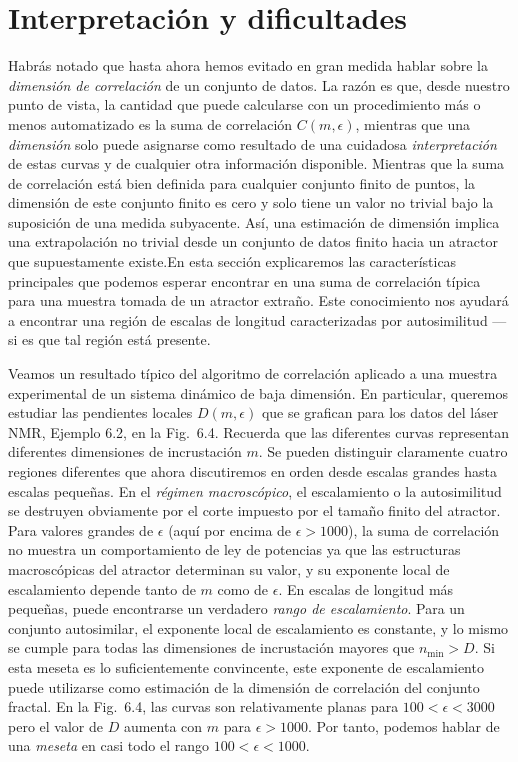 \documentclass[10pt,a4paper]{book}
\begin{document}
\newpage

\section{Interpretación y dificultades}

Habrás notado que hasta ahora hemos evitado en gran medida hablar sobre la \textit{dimensión de correlación} de un conjunto de datos. La razón es que, desde nuestro punto de vista, la cantidad que puede calcularse con un procedimiento más o menos automatizado es la suma de correlación $C(m, \epsilon)$, mientras que una \textit{dimensión} solo puede asignarse como resultado de una cuidadosa \textit{interpretación} de estas curvas y de cualquier otra información disponible. Mientras que la suma de correlación está bien definida para cualquier conjunto finito de puntos, la dimensión de este conjunto finito es cero y solo tiene un valor no trivial bajo la suposición de una medida subyacente. Así, una estimación de dimensión implica una extrapolación no trivial desde un conjunto de datos finito hacia un atractor que supuestamente existe.En esta sección explicaremos las características principales que podemos esperar encontrar en una suma de correlación típica para una muestra tomada de un atractor extraño. Este conocimiento nos ayudará a encontrar una región de escalas de longitud caracterizadas por autosimilitud — si es que tal región está presente.


\bigskip

Veamos un resultado típico del algoritmo de correlación aplicado a una muestra experimental de un sistema dinámico de baja dimensión. En particular, queremos estudiar las pendientes locales $D(m, \epsilon)$ que se grafican para los datos del láser NMR, Ejemplo 6.2, en la Fig.~6.4. Recuerda que las diferentes curvas representan diferentes dimensiones de incrustación $m$. Se pueden distinguir claramente cuatro regiones diferentes que ahora discutiremos en orden desde escalas grandes hasta escalas pequeñas. En el \textit{régimen macroscópico}, el escalamiento o la autosimilitud se destruyen obviamente por el corte impuesto por el tamaño finito del atractor. Para valores grandes de $\epsilon$ (aquí por encima de $\epsilon > 1000$), la suma de correlación no muestra un comportamiento de ley de potencias ya que las estructuras macroscópicas del atractor determinan su valor, y su exponente local de escalamiento depende tanto de $m$ como de $\epsilon$. En escalas de longitud más pequeñas, puede encontrarse un verdadero \textit{rango de escalamiento}. Para un conjunto autosimilar, el exponente local de escalamiento es constante, y lo mismo se cumple para todas las dimensiones de incrustación mayores que $n_{\min} > D$. Si esta meseta es lo suficientemente convincente, este exponente de escalamiento puede utilizarse como estimación de la dimensión de correlación del conjunto fractal. En la Fig.~6.4, las curvas son relativamente planas para $100 < \epsilon < 3000$ pero el valor de $D$ aumenta con $m$ para $\epsilon > 1000$. Por tanto, podemos hablar de una \textit{meseta} en casi todo el rango $100 < \epsilon < 1000$.
\end{document}
